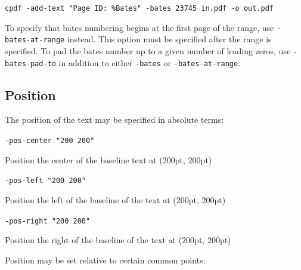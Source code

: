 \documentclass{book}
\begin{document}
  \begin{framed}
    \noindent\small\verb!cpdf -add-text "Page ID: %Bates" -bates 23745 in.pdf -o out.pdf!
  \end{framed}

\noindent To specify that bates numbering begins at the first page of the range, use \texttt{-bates-at-range} instead. This option must be specified after the range is specified. To pad the bates number up to a given number of leading zeros, use \texttt{-bates-pad-to} in addition to either \texttt{-bates} or \texttt{-bates-at-range}.



  \subsection{Position}
  \label{position}
  The position of the text may be specified in absolute terms:
  \begin{framed}
    \noindent\small\verb!-pos-center "200 200"!
  
    \vspace{2.5mm}
    \noindent Position the center of the baseline text at (200pt, 200pt)

    \vspace{2.5mm}
    \noindent\small\verb!-pos-left "200 200"!
  
    \vspace{2.5mm}
    \noindent Position the left of the baseline of the text at (200pt, 200pt)

    \vspace{2.5mm}
    \noindent\small\verb!-pos-right "200 200"!
  
    \vspace{2.5mm}
    \noindent Position the right of the baseline of the text at (200pt, 200pt)

  \end{framed}

  \noindent Position may be set relative to certain common points:
\end{document}
